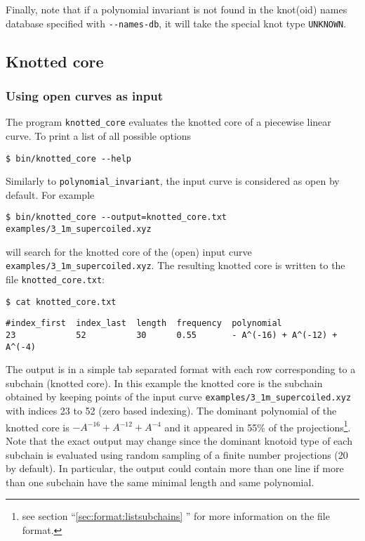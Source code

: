 Finally, note that if a polynomial invariant is not found in the knot(oid) names database specified with  \lstinline{--names-db}, it will take the special knot type \lstinline{UNKNOWN}.

\subsection{Knotted core}
\subsubsection{Using open curves as input}
The program \lstinline{knotted_core} evaluates the knotted core of a piecewise linear curve. To print a list of all possible options
\begin{lstlisting}
$ bin/knotted_core --help
\end{lstlisting}
Similarly to \lstinline{polynomial_invariant}, the input curve is considered as open by default. For example
\begin{lstlisting}
$ bin/knotted_core --output=knotted_core.txt examples/3_1m_supercoiled.xyz
\end{lstlisting}
will search for the knotted core of the (open) input curve \lstinline{examples/3_1m_supercoiled.xyz}. The resulting knotted core is written to the file \lstinline{knotted_core.txt}:
\begin{lstlisting}
$ cat knotted_core.txt
\end{lstlisting}
\begin{lstlisting}
#index_first  index_last  length  frequency  polynomial
23            52          30      0.55       - A^(-16) + A^(-12) + A^(-4)
\end{lstlisting}
The output is in a simple tab separated format with each row corresponding to a subchain (knotted core). In this example the knotted core is the subchain obtained by keeping points of the input curve \lstinline{examples/3_1m_supercoiled.xyz} with indices 23 to 52 (zero based indexing). The dominant polynomial of the knotted core is $-A^{-16}+A^{-12}+A^{-4}$ and it appeared in 55\% of the projections\footnote{see section ``\ref{sec:format:listsubchains} '' for more information on the file format.}. Note that the exact output may change since the dominant knotoid type of each subchain is evaluated using random sampling of a finite number projections (20 by default). %
In particular, the output could contain more than one line if more than one subchain have the same minimal length and same polynomial.

